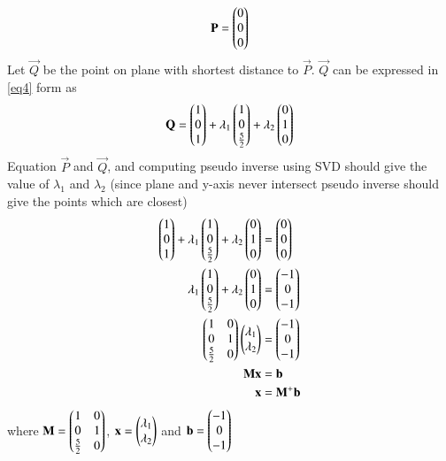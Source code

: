 \documentclass[journal,12pt,twocolumn]{IEEEtran}
\begin{document}
\begin{equation}\label{eq5}
	\mathbf{P} = \begin{pmatrix}0\\0\\0\end{pmatrix}
\end{equation}
Let $\vec{Q}$ be the point on plane with shortest distance to $\vec{P}$. $\vec{Q}$ can be expressed in \eqref{eq4} form as
\begin{align}\label{eq6}
	\mathbf{Q} = \begin{pmatrix}1\\0\\1\end{pmatrix} + \lambda_1\begin{pmatrix}1\\0\\\frac{5}{2}\end{pmatrix} + \lambda_2\begin{pmatrix}0\\1\\0\end{pmatrix}
\end{align}
Equation $\vec{P}$ and $\vec{Q}$, and computing pseudo inverse using SVD should give the value of $\lambda_1$ and $\lambda_2$ (since plane and y-axis never intersect pseudo inverse should give the points which are closest)
\begin{align}
	\label{eq7}\begin{pmatrix}1\\0\\1\end{pmatrix} + \lambda_1\begin{pmatrix}1\\0\\\frac{5}{2}\end{pmatrix} + \lambda_2\begin{pmatrix}0\\1\\0\end{pmatrix} &= \begin{pmatrix}0\\0\\0\end{pmatrix}\\
	\label{eq8}\lambda_1\begin{pmatrix}1\\0\\\frac{5}{2}\end{pmatrix} + \lambda_2\begin{pmatrix}0\\1\\0\end{pmatrix} &= \begin{pmatrix}-1\\0\\-1\end{pmatrix}\\
	\label{eq9}\begin{pmatrix}1 & 0\\0 & 1\\\frac{5}{2} & 0\end{pmatrix} \begin{pmatrix}\lambda_1 \\ \lambda_2\end{pmatrix} &=\begin{pmatrix}-1\\0\\-1\end{pmatrix}\\
	\label{eq10}\mathbf{M}\mathbf{x} &= \mathbf{b}\\
	\label{eq11}\mathbf{x} &= \mathbf{M}^{+}\mathbf{b}
\end{align}
where $\mathbf{M} = \begin{pmatrix}1 & 0\\0 & 1\\\frac{5}{2} & 0\end{pmatrix}$, $\mathbf{x}= \begin{pmatrix}\lambda_1 \\ \lambda_2\end{pmatrix}$ and $\mathbf{b}=\begin{pmatrix}-1\\0\\-1\end{pmatrix}$\\
\end{document}
